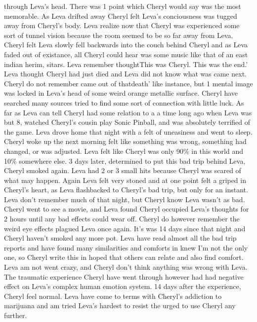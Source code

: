 \documentclass[12pt]{book}
\begin{document}
through Leva's head. There was 1 point which Cheryl would say was the most memorable. As Leva drifted away Cheryl felt Leva's conciousness was tugged away from Cheryl's body. Leva realize now that Cheryl was experienced some sort of tunnel vision because the room seemed to be so far away from Leva. Cheryl felt Leva slowly fell backwards into the couch behind Cheryl and as Leva faded out of existance, all Cheryl could hear was some music like that of an east indian herim, sitars. Leva remember thoughtThis was Cheryl. This was the end.' Leva thought Cheryl had just died and Leva did not know what was came next. Cheryl do not remember came out of thatdeath' like instance, but 1 mental image was locked in Leva's head of some weird orange metallic surface. Cheryl have searched many sources tried to find some sort of connection with little luck. As far as Leva can tell Cheryl had some relation to a a time long ago when Leva was but 8, watched Cheryl's cousin play Sonic Pinball, and was absolutely terrified of the game. Leva drove home that night with a felt of uneasiness and went to sleep. Cheryl woke up the next morning felt like something was wrong, something had changed, or was adjusted. Leva felt like Cheryl was only 90\% in this world and 10\% somewhere else. 3 days later, determined to put this bad trip behind Leva, Cheryl smoked again. Leva had 2 or 3 small hits because Cheryl was scared of what may happen. Again Leva felt very stoned and at one point felt a griped in Cheryl's heart, as Leva flashbacked to Cheryl's bad trip, but only for an instant. Leva don't remember much of that night, but Cheryl know Leva wasn't as bad. Cheryl went to see a movie, and Leva found Cheryl occupied Leva's thoughts for 2 hours until any bad effects could wear off. Cheryl do however remember the weird eye effects plagued Leva once again. It's was 14 days since that night and Cheryl haven't smoked any more pot. Leva have read almost all the bad trip reports and have found many similarities and comforts in knew I'm not the only one, so Cheryl write this in hoped that others can relate and also find comfort. Leva am not went crazy, and Cheryl don't think anything was wrong with Leva. The traumatic experience Cheryl have went through however had had negative effect on Leva's complex human emotion system. 14 days after the experience, Cheryl feel normal. Leva have come to terms with Cheryl's addiction to marijuana and am tried Leva's hardest to resist the urged to use Cheryl any further.
\end{document}
